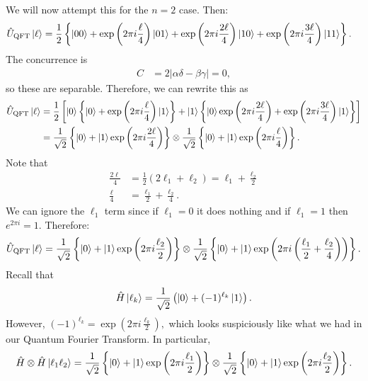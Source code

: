 \documentclass{article}
\numberwithin{equation}{section}
\begin{document}
We will now attempt this for the $n=2$ case. Then:
\begin{align}
    \hat{U}_\text{QFT} \ket{\ell} &= \frac{1}{2} \left\{ \ket{00} + \exp\left(2\pi i \frac{\ell}{4}\right)\ket{01} + \exp\left(2\pi i \frac{2\ell}{4}\right)\ket{10} + \exp\left(2\pi i \frac{3\ell}{4}\right)\ket{11}\right\}.
\end{align}
The concurrence is
\begin{align}
    C &= 2|\alpha\delta-\beta\gamma| = 0,
\end{align}
so these are separable. Therefore, we can rewrite this as
\begin{align}
    \hat{U}_\text{QFT} \ket{\ell} &= \frac{1}{2} \left[\ket{0}\left\{\ket{0} + \exp\left(2\pi i \frac{\ell}{4}\right)\ket{1}\right\} + \ket{1}\left\{\ket{0}\exp\left(2\pi i \frac{2\ell}{4}\right) + \exp\left(2\pi i \frac{3\ell}{4}\right)\ket{1}\right\}\right] \\ 
    &= \frac{1}{\sqrt{2}}\left\{\ket{0} +\ket{1} \exp\left(2\pi i \frac{2\ell}{4}\right)\right\} \otimes \frac{1}{\sqrt{2}}\left\{\ket{0} + \ket{1} \exp\left(2\pi i \frac{\ell}{4}\right)\right\}.
\end{align}
Note that 
\begin{align*}
    \frac{2\ell}{4} &= \frac{1}{2} \left(2\ell_1 + \ell_2\right) = \ell_1 + \frac{\ell_2}{2} \\ 
    \frac{\ell}{4} &= \frac{\ell_1}{2} +\frac{\ell_2}{4}.
\end{align*}
We can ignore the $\ell_1$ term since if $\ell_1=0$ it does nothing and if $\ell_1=1$ then $e^{2\pi i} = 1$. Therefore:
\begin{equation}
    \hat{U}_\text{QFT}\ket{\ell} = \frac{1}{\sqrt{2}}\left\{\ket{0} +\ket{1} \exp\left(2\pi i \frac{\ell_2}{2}\right)\right\} \otimes \frac{1}{\sqrt{2}}\left\{\ket{0} + \ket{1} \exp\left(2\pi i \left(\frac{\ell_1}{2}+\frac{\ell_2}{4}\right)\right)\right\}.
\end{equation}
Recall that
\begin{equation}
    \hat{H}\ket{\ell_k} = \frac{1}{\sqrt{2}}\left(\ket{0} + (-1)^{\ell_k}\ket{1}\right).
\end{equation}
However, $(-1)^{\ell_k} = \exp\left(2\pi i \frac{\ell_k}{2}\right),$ which looks suspiciously like what we had in our Quantum Fourier Transform. In particular,
\begin{equation}
    \hat{H} \otimes \hat{H} \ket{\ell_1\ell_2} = \frac{1}{\sqrt{2}}\left\{\ket{0} +\ket{1} \exp\left(2\pi i \frac{\ell_1}{2}\right)\right\} \otimes \frac{1}{\sqrt{2}}\left\{\ket{0} + \ket{1} \exp\left(2\pi i \frac{\ell_2}{2}\right)\right\}.
\end{equation}
\end{document}
